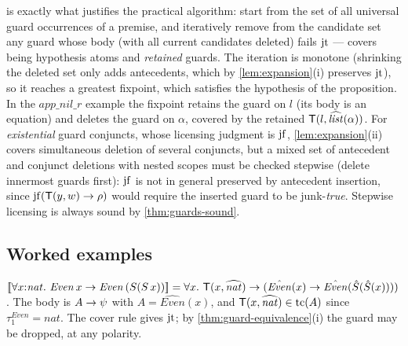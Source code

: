 \begin{remark}
  \label{rem:fixpoint}
   is exactly what justifies the practical
  algorithm: start from the set of all universal guard occurrences of a
  premise, and iteratively remove from the candidate set any guard whose
  body (with all current candidates deleted) fails $\mathrm{jt}$ --- covers being
  hypothesis atoms and \emph{retained} guards.  The iteration is monotone
  (shrinking the deleted set only adds antecedents, which by
  \cref{lem:expansion}(i) preserves $\mathrm{jt}$), so it reaches a greatest
  fixpoint, which satisfies the hypothesis of the proposition.  In the
  $\mathit{app\_nil\_r}$ example the fixpoint retains the guard on $l$
  (its body is an equation) and deletes the guard on $\alpha$, covered by
  the retained $\mathsf{T}(l, \widehat{\mathit{list}}(\alpha))$.  For
  \emph{existential} guard conjuncts, whose licensing judgment is $\mathrm{jf}$,
  \cref{lem:expansion}(ii) covers simultaneous deletion of several
  conjuncts, but a mixed set of antecedent and conjunct deletions with
  nested scopes must be checked stepwise (delete innermost guards first):
  $\mathrm{jf}$ is not in general preserved by antecedent insertion, since
  $\mathrm{jf}(\mathsf{T}(y,w) \rightarrow \rho)$ would require the inserted guard to be
  junk-\emph{true}.  Stepwise licensing is always sound by
  \cref{thm:guards-sound}.
\end{remark}

\subsection{Worked examples}
\label{subsec:guard-examples}

\begin{example}
  \label{ex:even}
  $[\![ \forall x{:}\mathit{nat}.\ \mathit{Even}\,x \rightarrow
    \mathit{Even}\,(S(S\,x)) ]\!]
  = \forall x.\ \mathsf{T}(x, \widehat{\mathit{nat}}) \rightarrow
  (\hat{\mathit{Even}}(x) \rightarrow \hat{\mathit{Even}}(\hat S(\hat S(x))))$.
  The body is $A \rightarrow \psi$ with $A = \hat{\mathit{Even}}(x)$, and
  $\mathsf{T}(x, \widehat{\mathit{nat}}) \in \mathrm{tc}(A)$ since
  $\tau^{\mathit{Even}}_1 = \mathit{nat}$.  The cover rule gives $\mathrm{jt}$;
  by \cref{thm:guard-equivalence}(i) the guard may be dropped, at any
  polarity.
\end{example}

